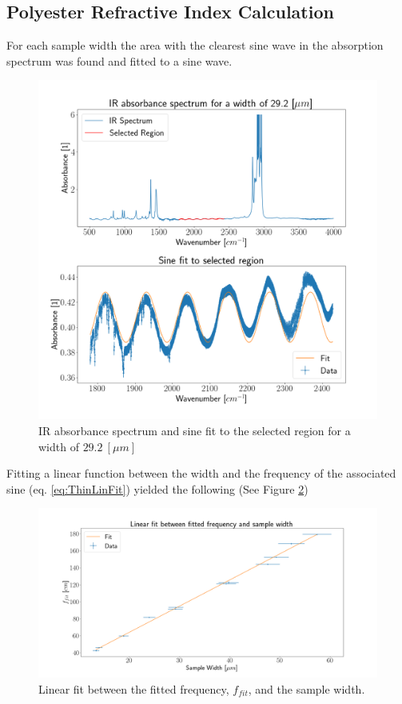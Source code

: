 \documentclass[reprint,amsmath,amssymb,aps, prl]{revtex4-2}
\begin{document}
\subsection{Polyester Refractive Index Calculation}
For each sample width the area with the clearest sine wave in the absorption spectrum was found and fitted to a sine wave.
\begin{figure}[h]
    
    \includegraphics[width=\linewidth]{Images/29_2_Spec.png}
    \caption{IR absorbance spectrum and sine fit to the selected region for a width of $29.2\ [\mu m]$}
    \label{fig:SineFitEx}
    \centering
\end{figure}
Fitting a linear function between the width and the frequency of the associated sine (eq. \ref{eq:ThinLinFit}) yielded the following (See Figure \ref{fig:ThinLinWidthFreq})
\begin{figure}[h]
    \includegraphics[width=\linewidth]{Images/__linear_fit.png}
    \caption{Linear fit between the fitted frequency, $f_{fit}$, and the sample width.}
    \label{fig:ThinLinWidthFreq}
    \centering
\end{figure}
\end{document}
